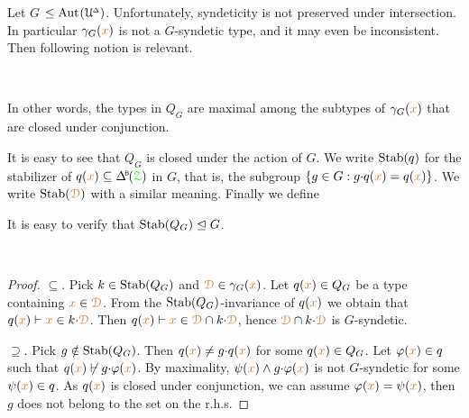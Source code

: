 Let \emph{$G$\/} $\le{\rm Aut\kern.15ex}(\EuScript U\kern-.2ex^{\scriptscriptstyle\Delta})$.
Unfortunately, syndeticity is not preserved under intersection.
In particular $\gamma_G({\color{brown} x})$ is not a $G$-syndetic type, and it may even be inconsistent.
Then following notion is relevant.

\begin{definition}\label{def_Q}\ 

  \smallskip

  In other words, the types in $Q_G$ are maximal among the subtypes of $\gamma_G({\color{brown} x})$ that are closed under conjunction.
\end{definition}

It is easy to see that $Q_G$ is closed under the action of $G$.
We write ${\rm Stab}(q)$ for the stabilizer of $q({\mr x})\subseteq\BDelta(\grZ)$ in $G$, that is, the subgroup $\{g\in G:g{\cdot}q({\color{brown} x})=q({\color{brown} x})\}$.
We write ${\rm Stab}({\color{brown}\EuScript D})$ with a similar meaning.
Finally we define


It is easy to verify that ${\rm Stab}(Q_G)\trianglelefteq G$.

\begin{proposition}\label{prop_StabQ}\ \smallskip

  \smallskip
\end{proposition}

\begin{proof}
  $\subseteq$. 
  Pick $k\in{\rm Stab}(Q_G)$ and ${\color{brown}\EuScript D}\in\gamma_G({\color{brown} x})$.
  Let $q({\color{brown} x})\in Q_G$ be a type containing ${\color{brown} x}\in{\color{brown}\EuScript D}$.
  From the ${\rm Stab}(Q_G)$-invariance of $q({\color{brown} x})$ we obtain that $q({\color{brown} x})\vdash {\color{brown}x}\in k{\cdot}{\color{brown}\EuScript D}$.
  Then $q({\color{brown} x})\vdash {\color{brown}x}\in {\color{brown}\EuScript D}\cap k{\cdot}{\color{brown}\EuScript D}$, hence ${\color{brown}\EuScript D}\cap k{\cdot}{\color{brown}\EuScript D}$ is $G$-syndetic.

  $\supseteq$. 
  Pick $g\notin {\rm Stab}(Q_G)$.
  Then $q({\color{brown} x})\neq g{\cdot}q({\color{brown} x})$ for some $q({\color{brown} x})\in Q_G$.
  Let $\varphi({\color{brown} x})\in q$ such that $q({\color{brown} x})\not\vdash g{\cdot}\varphi({\color{brown} x})$.
  By maximality, $\psi({\color{brown} x})\wedge g{\cdot}\varphi({\color{brown} x})$ is not $G$-syndetic for some $\psi({\color{brown} x})\in q$.
  As $q({\color{brown} x})$ is closed under conjunction, we can assume $\varphi({\color{brown} x})=\psi({\color{brown} x})$, then $g$ does not belong to the set on the r.h.s.
\end{proof}

